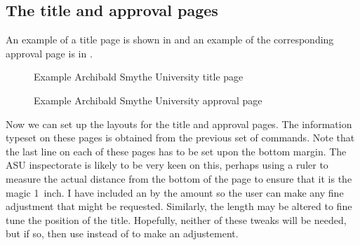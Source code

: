 \subsection{The title and approval pages}

An example of a title page is shown in  and 
an example of the corresponding approval page is in .

\begin{figure}
\centering
\begin{showtitle}
  \titleASUt
\end{showtitle}
\caption{Example Archibald Smythe University title page}\label{fig:titleASUt}
\end{figure}

\begin{figure}
\centering
\begin{showtitle}
  \titleASUa
\end{showtitle}
\caption{Example Archibald Smythe University approval page}\label{fig:titleASUa}
\end{figure}

    Now we can set up the layouts for the title and approval pages. The
information typeset on these pages is obtained from the previous set of 
commands. Note that the last line on each of these pages has to be set
upon the bottom margin. The ASU inspectorate is likely to be very
keen on this, perhaps using a ruler to measure the actual distance from 
the bottom of the page to ensure that it is the magic 1~inch. I have
included an \cmd{\enlargethispage} by the amount  so the
user can make any fine adjustment that might be requested. Similarly, the
length  may be altered to fine tune the position of the
title. Hopefully, neither of these tweaks will be needed, but if so, then use
\cmd{\addtolength} instead of \cmd{\setlength} to make an adjustement.

\begin{lcode}
\newcommand{\thetitlepage}{{%
  \clearpage
  \thispagestyle{empty}
  \centering
  \vspace*{-\toptafiddle}
  \asutitle \\ by \\ \asuauthor
  \vfill

  {\SingleSpace
  A \asudoctype\ Presented in Partial Fulfillment \\
  of the Requirements for the Degree \\
  \asudegree\par}

  \vfill
  ARCHIBALD SMYTHE UNIVERSITY \\
  \asugraddate 
  \par
  \enlargethispage{\bottafiddle}
  \clearpage}}

\end{lcode}

